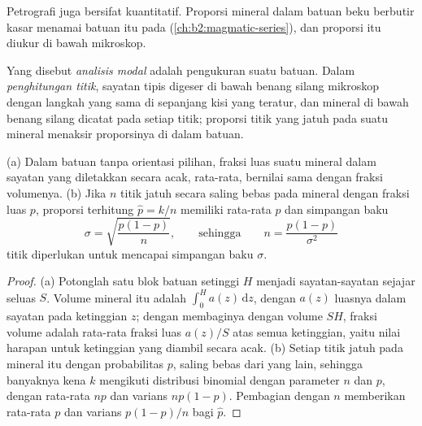 Petrografi juga bersifat kuantitatif. Proporsi mineral dalam batuan beku berbutir kasar
menamai batuan itu pada  (\cref{ch:b2:magmatic-series}), dan proporsi itu diukur di bawah
mikroskop.

\begin{definition}\label{def:b2:field-lab-methods-2:modal}
Yang disebut \emph{analisis modal} adalah pengukuran  suatu
batuan. Dalam \emph{penghitungan titik}, sayatan
tipis digeser di bawah benang silang mikroskop dengan langkah yang sama di sepanjang kisi yang teratur, dan
mineral di bawah benang silang dicatat pada setiap titik; proporsi titik yang
jatuh pada suatu mineral menaksir proporsinya di dalam batuan.
\end{definition}

\begin{proposition}\label{prop:b2:field-lab-methods-2:counting}
(a) Dalam batuan tanpa orientasi pilihan, fraksi luas suatu mineral dalam sayatan yang diletakkan
secara acak, rata-rata, bernilai sama dengan fraksi volumenya. (b) Jika $n$ titik jatuh secara saling bebas
pada mineral dengan fraksi luas $p$, proporsi terhitung $\hat p = k/n$ memiliki rata-rata $p$ dan simpangan
baku
\begin{equation}
\sigma = \sqrt{\frac{p(1-p)}{n}} , \qquad\text{sehingga}\qquad n = \frac{p(1-p)}{\sigma^2}
\label{eq:b2:field-lab-methods-2:binomial}
\end{equation}
titik diperlukan untuk mencapai simpangan baku $\sigma$.
\end{proposition}

\begin{proof}
(a) Potonglah satu blok batuan setinggi $H$ menjadi sayatan-sayatan sejajar seluas $S$. Volume
mineral itu adalah $\int_0^H a(z)\,\mathrm{d}z$, dengan $a(z)$ luasnya dalam sayatan pada ketinggian $z$;
dengan membaginya dengan volume $SH$, fraksi volume adalah rata-rata fraksi luas $a(z)/S$ atas
semua ketinggian, yaitu nilai harapan untuk ketinggian yang diambil secara acak. (b) Setiap titik jatuh pada
mineral itu dengan probabilitas $p$, saling bebas dari yang lain, sehingga banyaknya kena $k$ mengikuti
distribusi binomial dengan parameter $n$ dan $p$, dengan rata-rata $np$ dan varians $np(1-p)$. Pembagian dengan
$n$ memberikan rata-rata $p$ dan varians $p(1-p)/n$ bagi $\hat p$.
\end{proof}


